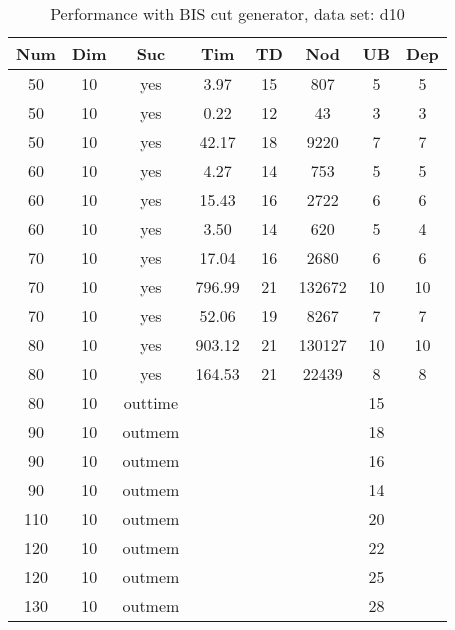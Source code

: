 \begin{table}[!htb]
  \centering
  \begin{tabular}[center]{|c|c|c|c|c|c|c|c|}
    \hline
    Num & Dim & Suc & Tim & TD & Nod & UB & Dep \\
    \hline
    50 & 10 & yes & 3.97 & 15 & 807 & 5 & 5 \\
    50 & 10 & yes & 0.22 & 12 & 43 & 3 & 3 \\
    50 & 10 & yes & 42.17 & 18 & 9220 & 7 & 7 \\
    60 & 10 & yes & 4.27 & 14 & 753 & 5 & 5 \\
    60 & 10 & yes & 15.43 & 16 & 2722 & 6 & 6 \\
    60 & 10 & yes & 3.50 & 14 & 620 & 5 & 4 \\
    70 & 10 & yes & 17.04 & 16 & 2680 & 6 & 6 \\
    70 & 10 & yes & 796.99 & 21 & 132672 & 10 & 10 \\
    70 & 10 & yes & 52.06 & 19 & 8267 & 7 & 7 \\
    80 & 10 & yes & 903.12 & 21 & 130127 & 10 & 10 \\
    80 & 10 & yes & 164.53 & 21 & 22439 & 8 & 8 \\
    80 & 10 & outtime &&&& 15 &\\
    90 & 10 & outmem &&&& 18 &\\
    90 & 10 & outmem &  &  &  & 16 &  \\
    90 & 10 & outmem &&&& 14 &\\
    110 & 10 & outmem &&&& 20 &\\
    120 & 10 & outmem &&&& 22 &\\
    120 & 10 & outmem &&&& 25 &\\
    130 & 10 & outmem &&&& 28 &\\
    \hline
  \end{tabular}
  \caption{Performance with BIS cut generator, data set: d10}
  \label{tab:test.cutbis-d10}
\end{table}

